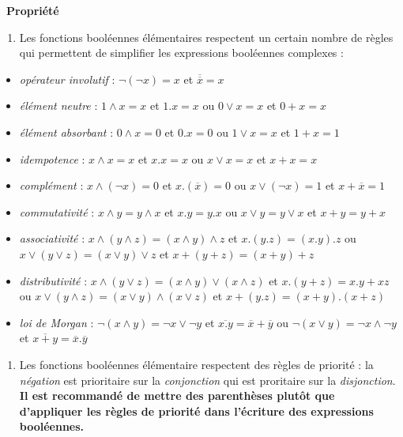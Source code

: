 \documentclass[
  11pt,
]{article}
\providecommand{\tightlist}{%
  \setlength{\itemsep}{0pt}\setlength{\parskip}{0pt}}
\newcounter{prop}
\newenvironment{propriete}[1]
{\par \medskip   \addtocounter{prop}{1} \noindent  
\begin{bclogo}[arrondi =0.1,  ombre = true, barre=none, logo=\bcbook, marge=4]{~\textbf{Propriété} \textbf{\theprop} {\itshape #1} }   \par}
{
\end{bclogo}
 \par \bigskip }
\newcounter{def}
\begin{document}
\begin{propriete}{}

\begin{enumerate}
\def\labelenumi{\arabic{enumi}.}
\tightlist
\item
  Les fonctions booléennes élémentaires respectent un certain nombre de
  règles qui permettent de simplifier les expressions booléennes
  complexes :
\end{enumerate}

\begin{itemize}
\tightlist
\item
  \emph{opérateur involutif} : \(\neg(\neg x) = x\) et
  \(\overline{\overline{x}}=x\)
\item
  \emph{élément neutre} : \(1 \wedge x = x\) et \(1 . x =x\) ou
  \(0 \vee x = x\) et \(0 + x =x\)
\item
  \emph{élément absorbant} : \(0 \wedge x = 0\) et \(0 . x =0\) ou
  \(1 \vee x = x\) et \(1 + x =1\)
\item
  \emph{idempotence} : \(x \wedge x = x\) et \(x . x =x\) ou
  \(x \vee x = x\) et \(x + x =x\)
\item
  \emph{complément} : \(x \wedge (\neg x) = 0\) et
  \(x . (\overline{x}) =0\) ou \(x \vee (\neg x) = 1\) et
  \(x + \overline{x} =1\)
\item
  \emph{commutativité} : \(x \wedge y = y \wedge x\) et
  \(x . y = y . x\) ou \(x \vee y = y \vee x\) et \(x + y = y + x\)
\item
  \emph{associativité} :
  \(x \wedge ( y \wedge z) = (x \wedge y) \wedge z\) et
  \(x . (y . z) = (x . y) . z\) ou
  \(x \vee ( y \vee z) = (x \vee y) \vee z\) et
  \(x + (y + z) = (x + y) + z\)
\item
  \emph{distributivité} :
  \(x \wedge ( y \vee z) = (x \wedge y) \vee (x \wedge z)\) et
  \(x . (y + z) = x . y + x z\) ou
  \(x \vee ( y \wedge z) = (x \vee y) \wedge (x \vee z)\) et
  \(x + (y . z) = (x + y) . (x + z)\)
\item
  \emph{loi de Morgan} : \(\neg(x \wedge y) = \neg x \vee \neg y\) et
  \(\overline{x . y} = \overline{x} + \overline{y}\) ou
  \(\neg(x \vee y) = \neg x \wedge \neg y\) et
  \(\overline{x + y} = \overline{x} . \overline{y}\)
\end{itemize}

\begin{enumerate}
\def\labelenumi{\arabic{enumi}.}
\setcounter{enumi}{1}
\tightlist
\item
  Les fonctions booléennes élémentaire respectent des règles de priorité
  : la \emph{négation} est prioritaire sur la \emph{conjonction} qui est
  proritaire sur la \emph{disjonction}.\\
  \textbf{Il est recommandé de mettre des parenthèses plutôt que
  d'appliquer les règles de priorité dans l'écriture des expressions
  booléennes.}
\end{enumerate}

\end{propriete}
\end{document}
